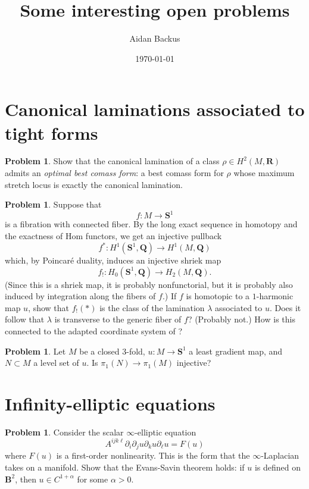 \documentclass[reqno,11pt]{amsart}
\title{Some interesting open problems}
\author{Aidan Backus}
\date{\today}
\newcommand{\QQ}{\mathbf{Q}}
\newcommand{\RR}{\mathbf{R}}
\newcommand{\Sph}{\mathbf S}
\newcommand{\Ball}{\mathbf{B}}
\newcommand{\dfn}[1]{\emph{#1}\index{#1}}
\theoremstyle{definition}
\newtheorem{problem}[theorem]{Problem}
\numberwithin{equation}{section}
\begin{document}
\maketitle

\section{Canonical laminations associated to tight forms}

\begin{problem}
Show that the canonical lamination of a class $\rho \in H^2(M, \RR)$ admits an \dfn{optimal best comass form}: a best comass form for $\rho$ whose maximum stretch locus is exactly the canonical lamination.
\end{problem}

\begin{problem}
Suppose that 
$$f: M \to \Sph^1$$
is a fibration with connected fiber.
By the long exact sequence in homotopy and the exactness of Hom functors, we get an injective pullback 
$$f^*: H^1(\Sph^1, \QQ) \to H^1(M, \QQ)$$
which, by Poincar\'e duality, induces an injective shriek map 
$$f_!: H_0(\Sph^1, \QQ) \to H_2(M, \QQ).$$
(Since this is a shriek map, it is probably nonfunctorial, but it is probably also induced by integration along the fibers of $f$.)
If $f$ is homotopic to a $1$-harmonic map $u$, show that $f_!(*)$ is the class of the lamination $\lambda$ associated to $u$.
Does it follow that $\lambda$ is transverse to the generic fiber of $f$? (Probably not.)
How is this connected to the adapted coordinate system of \cite[\S3.3]{daskalopoulos2022transverse}?
\end{problem}

\begin{problem}
Let $M$ be a closed $3$-fold, $u: M \to \Sph^1$ a least gradient map, and $N \subset M$ a level set of $u$. Is $\pi_1(N) \to \pi_1(M)$ injective?
\end{problem}

\section{Infinity-elliptic equations}
\begin{problem}
Consider the scalar $\infty$-elliptic equation 
$$A^{ijk\ell} \partial_i \partial_j u \partial_k u \partial_\ell u = F(u)$$
where $F(u)$ is a first-order nonlinearity.
This is the form that the $\infty$-Laplacian takes on a manifold.
Show that the Evans-Savin theorem \cite{Evans08} holds: if $u$ is defined on $\Ball^2$, then $u \in C^{1 + \alpha}$ for some $\alpha > 0$.
\end{problem}
\end{document}
